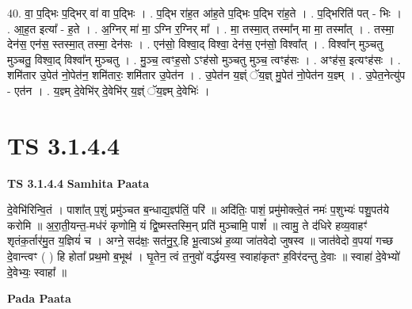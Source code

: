 \documentclass[17pt]{extarticle}
\begin{document}
40. वा॒ प॒द्भिः प॒द्भिर् वा॑ वा प॒द्भिः । . प॒द्भि रा॑ह॒त आ॑ह॒ते प॒द्भिः प॒द्भि रा॑ह॒ते । . प॒द्भिरिति॑ पत् - भिः । . आ॒ह॒त इत्या᳚ - ह॒ते । . अ॒ग्निर् मा॑ मा॒ ऽग्नि र॒ग्निर् मा᳚ । . मा॒ तस्मा॒त् तस्मा᳚न् मा मा॒ तस्मा᳚त् । . तस्मा॒ देन॑स॒ एन॑स॒ स्तस्मा॒त् तस्मा॒ देन॑सः । . एन॑सो॒ विश्वा॒द् विश्वा॒ देन॑स॒ एन॑सो॒ विश्वा᳚त् । . विश्वा᳚न् मुञ्चतु मुञ्चतु॒ विश्वा॒द् विश्वा᳚न् मुञ्चतु । . मु॒ञ्च॒ त्वꣳह॒सो ऽꣳह॑सो मुञ्चतु मुञ्च॒ त्वꣳह॑सः । . अꣳह॑स॒ इत्यꣳह॑सः । . शमि॑तार उ॒पेत॑ नो॒पेत॑न॒ शमि॑तारः॒ शमि॑तार उ॒पेत॑न । . उ॒पेत॑न य॒ज्ञ्ं ॅय॒ज्ञ् मु॒पेत॑ नो॒पेत॑न य॒ज्ञ्म् । . उ॒पेत॒नेत्यु॑प - एत॑न । . य॒ज्ञ्म् दे॒वेभि॑र् दे॒वेभि॑र् य॒ज्ञ्ं ॅय॒ज्ञ्म् दे॒वेभिः॑ । \newline
\pagebreak
{}

\section{ TS 3.1.4.4 }

\textbf{TS 3.1.4.4 } \newline
\textbf{Samhita Paata} \newline

दे॒वेभि॑रिन्वि॒तं । पाशा᳚त् प॒शुं प्रमु॑ञ्चत ब॒न्धाद्य॒ज्ञ्प॑तिं॒ परि॑ ॥ अदि॑तिः॒ पाशं॒ प्रमु॑मोक्त्वे॒तं नमः॑ प॒शुभ्यः॑ पशु॒पत॑ये करोमि ॥ अ॒रा॒ती॒यन्त॒-मध॑रं कृणोमि॒ यं द्वि॒ष्मस्तस्मि॒न् प्रति॑ मुञ्चामि॒ पाशं᳚ ॥ त्वामु॒ ते द॑धिरे हव्य॒वाहꣳ॑ शृतंक॒र्तार॑मु॒त य॒ज्ञियं॑ च । अग्ने॒ सद॑क्षः॒ सत॑नु॒र्॒.हि भू॒त्वाऽथ॑ ह॒व्या जा॑तवेदो जुषस्व ॥ जात॑वेदो व॒पया॑ गच्छ दे॒वान्त्वꣳ ( ) हि होता᳚ प्रथ॒मो ब॒भूथ॑ । घृ॒तेन॒ त्वं त॒नुवो॑ वर्द्धयस्व॒ स्वाहा॑कृतꣳ ह॒विर॑दन्तु दे॒वाः ॥ स्वाहा॑ दे॒वेभ्यो॑ दे॒वेभ्यः॒ स्वाहा᳚ ॥ \newline

\textbf{Pada Paata} \newline
\end{document}
